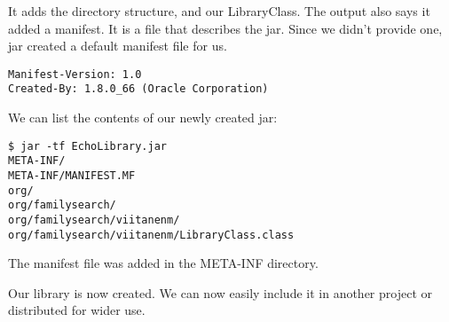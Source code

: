 It adds the directory structure, and our LibraryClass. The output also says it added a manifest.	 It is a file that describes the jar. Since we didn't provide one, jar created a default manifest file for us.
\begin{lstlisting}
Manifest-Version: 1.0
Created-By: 1.8.0_66 (Oracle Corporation)
\end{lstlisting}

We can list the contents of our newly created jar:
\begin{lstlisting}
$ jar -tf EchoLibrary.jar
META-INF/
META-INF/MANIFEST.MF
org/
org/familysearch/
org/familysearch/viitanenm/
org/familysearch/viitanenm/LibraryClass.class
\end{lstlisting}

The manifest file was added in the META-INF directory.

Our library is now created. We can now easily include it in another project or distributed for wider use.
